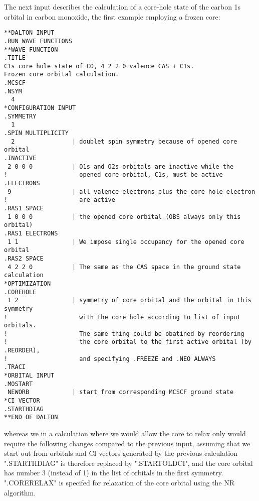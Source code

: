 \begin{center}
\end{center}

The next input describes the calculation of a core-hole state of the 
carbon 1s orbital in carbon monoxide, the first
example employing a frozen core:

\begin{verbatim}
**DALTON INPUT
.RUN WAVE FUNCTIONS
**WAVE FUNCTION
.TITLE
C1s core hole state of CO, 4 2 2 0 valence CAS + C1s.
Frozen core orbital calculation.
.MCSCF
.NSYM
  4
*CONFIGURATION INPUT
.SYMMETRY
  1
.SPIN MULTIPLICITY
  2                | doublet spin symmetry because of opened core orbital
.INACTIVE
 2 0 0 0           | O1s and O2s orbitals are inactive while the
!                    opened core orbital, C1s, must be active
.ELECTRONS
 9                 | all valence electrons plus the core hole electron
!                    are active
.RAS1 SPACE
 1 0 0 0           | the opened core orbital (OBS always only this orbital)
.RAS1 ELECTRONS
 1 1               | We impose single occupancy for the opened core orbital
.RAS2 SPACE
 4 2 2 0           | The same as the CAS space in the ground state calculation
*OPTIMIZATION
.COREHOLE
 1 2               | symmetry of core orbital and the orbital in this symmetry
!                    with the core hole according to list of input orbitals.
!                    The same thing could be obatined by reordering
!                    the core orbital to the first active orbital (by .REORDER),
!                    and specifying .FREEZE and .NEO ALWAYS
.TRACI
*ORBITAL INPUT
.MOSTART
 NEWORB            | start from corresponding MCSCF ground state
*CI VECTOR
.STARTHDIAG
**END OF DALTON
\end{verbatim}
\label{sirius_ex6}


whereas we in a calculation where we would allow the core to
relax only
would require the following changes compared to the previous input,
assuming that we start out from orbitals and CI vectors generated by the
previous calculation  ".STARTHDIAG" is therefore replaced by
".STARTOLDCI", and the core orbital has number 3 (instead of 1)
in the list of orbitals in the first symmetry. ".CORERELAX" is specifed
for relaxation of the core orbital using the NR algorithm.


